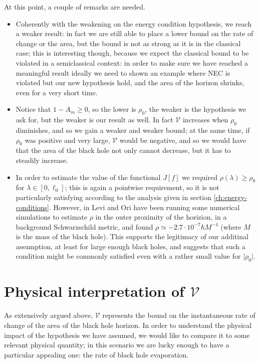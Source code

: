 \begin{remark}
	At this point, a couple of remarks are needed. 

	\begin{itemize}
		\item[\ding{99}] Coherently with the weakening on the energy condition hypothesis, we reach a weaker result: in fact we are still able to place a lower bound on the rate of change or the area, but the bound is not as strong as it is in the classical case; this is interesting though, because we expect the classical bound to be violated in a semiclassical context: in order to make sure we have reached a meaningful result ideally we need to shown an example where NEC is violated but our new hypothesis hold, and the area of the horizon shrinks, even for a very short time.
  		\item[\ding{99}] Notice that \(1-A_m \ge 0\), so the lower is \(\rho_0\), the weaker is the hypothesis we ask for, but the weaker is our result as well. In fact \(\mathcal{V}\) increases when \(\rho_0\) diminishes, and so we gain a weaker and weaker bound; at the same time, if \(\rho_0\) was positive and very large, \(\mathcal{V}\) would be negative, and so we would have that the area of the black hole not only cannot decrease, but it has to steadily increase.
    	\item[\ding{99}] In order to estimate the value of the functional \(J[f]\) we required \(\rho (\lambda)\ge\rho_0\) for \(\lambda\in [0, \ell_0]\); this is again a pointwise requirement, so it is not particularly satisfying according to the analysis given in section \ref{ch:energy-conditions}. However, in \cite{levi2016versatile} Levi and Ori have been running some numerical simulations to estimate \(\rho\) in the outer proximity of the horizion, in a background Schwarzschild metric, and found \(\rho \simeq -2.7\cdot 10^{-7} \hbar M^{-4}\) (where \(M\) is the mass of the black hole). This supports the legitimacy of our additinal assumption, at least for large enough black holes, and suggests that such a condition might be commonly satisfied even with a rather small value for \(\vert\rho_0\vert\).
	\end{itemize}
	
\end{remark}

\section{Physical interpretation of \(\mathcal{V}\)}
As extensively argued above, \(\mathcal{V}\) represents the bound on the instantaneous rate of change of the area of the black hole horizon. In order to understand the physical impact of the hypothesis we have assumed, we would like to compare it to some relevant physical quantity; in this scenario we are lucky enough to have a particular appealing one: the rate of black hole evaporation.

